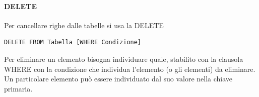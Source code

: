 \documentclass[10pt]{book}
\begin{document}
\paragraph{DELETE} Per cancellare righe dalle tabelle si usa la DELETE
\begin{lstlisting}
DELETE FROM Tabella [WHERE Condizione]
\end{lstlisting}
Per eliminare un elemento bisogna individuare quale, stabilito con la clausola WHERE con la condizione che individua l'elemento (o gli elementi) da eliminare.\\
Un particolare elemento può essere individuato dal suo valore nella chiave primaria.
\end{document}
